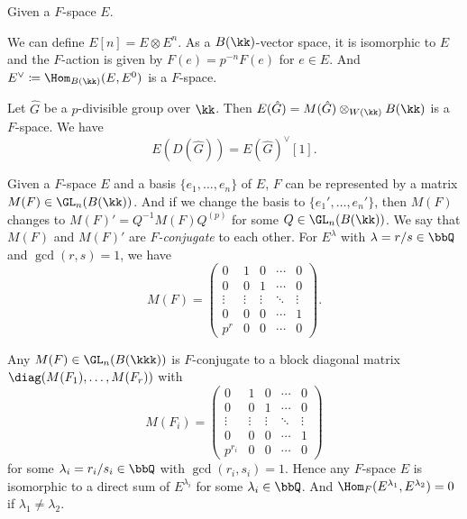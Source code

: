 \begin{example}
	Given a $F$-space $E$.

	We can define $E[n] = E \otimes E^n$.
	As a $B(\kk)$-vector space, it is isomorphic to $E$ and the $F$-action is given by $F(e) = p^{-n} F(e)$ for $e \in E$.
	And $E^\vee \coloneqq \Hom_{B(\kk)}(E, E^0)$ is a $F$-space.
\end{example}

Let $\hat{G}$ be a $p$-divisible group over $\kk$.
Then $E(\hat{G}) = M(\hat{G}) \otimes_{W(\kk)} B(\kk)$ is a $F$-space.
We have
\[ E(D(\hat{G})) = E(\hat{G})^\vee[1]. \]

Given a $F$-space $E$ and a basis $\{e_1, \ldots, e_n\}$ of $E$, $F$ can be represented by a matrix $M(F) \in \GL_n(B(\kk))$.
And if we change the basis to $\{e_1', \ldots, e_n'\}$, then $M(F)$ changes to $M(F)' = Q^{-1} M(F) Q^{(p)}$ for some $Q \in \GL_n(B(\kk))$.
We say that $M(F)$ and $M(F)'$ are \emph{$F$-conjugate} to each other.
For $E^\lambda$ with $\lambda = r/s \in \bbQ$ and $\gcd(r,s) = 1$, we have
\[ M(F) = \begin{pmatrix}
		0      & 1      & 0      & \cdots & 0      \\
		0      & 0      & 1      & \cdots & 0      \\
		\vdots & \vdots & \vdots & \ddots & \vdots \\
		0      & 0      & 0      & \cdots & 1      \\
		p^r    & 0      & 0      & \cdots & 0
	\end{pmatrix}. \]

\begin{theorem}
	Any $M(F) \in \GL_n(B(\kkk))$ is $F$-conjugate to a block diagonal matrix
	$\diag(M(F_1), \ldots, M(F_r))$ with
	\[M(F_i) = \begin{pmatrix}
			0       & 1      & 0      & \cdots & 0      \\
			0       & 0      & 1      & \cdots & 0      \\
			\vdots  & \vdots & \vdots & \ddots & \vdots \\
			0       & 0      & 0      & \cdots & 1      \\
			p^{r_i} & 0      & 0      & \cdots & 0
		\end{pmatrix} \]
	for some $\lambda_i = r_i/s_i \in \bbQ$ with $\gcd(r_i, s_i) = 1$.
	Hence any $F$-space $E$ is isomorphic to a direct sum of $E^{\lambda_i}$ for some $\lambda_i \in \bbQ$.
	And $\Hom_{F}(E^{\lambda_1}, E^{\lambda_2}) = 0$ if $\lambda_1 \neq \lambda_2$.
\end{theorem}

